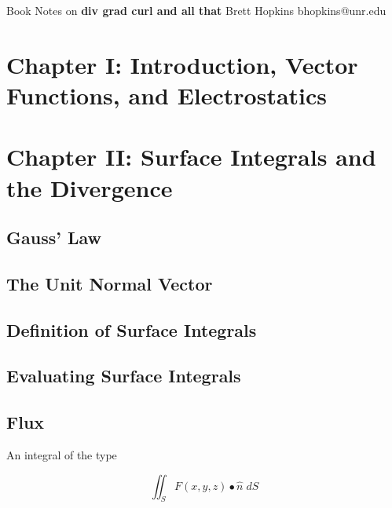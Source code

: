 \documentclass[11pt]{article}
\begin{document}
\thispagestyle{empty}
\vspace*{\fill}

\begin{center}
{\fontsize{22}{22} \selectfont Book Notes on}
\vskip 16pt
{\fontsize{36}{36} \selectfont \bf \sffamily div grad curl and all that}
\vskip 24pt
{\fontsize{18}{18} \selectfont \rmfamily Brett Hopkins}
\vskip 6pt
{\fontsize{14}{14} \selectfont \ttfamily bhopkins@unr.edu}
\vskip 12pt
\end{center}

\vspace*{\fill}

\newpage
\microtoc
\newpage

\section{Chapter I: Introduction, Vector Functions, and Electrostatics}

\section{Chapter II: Surface Integrals and the Divergence}

\subsection{Gauss' Law}

\subsection{The Unit Normal Vector}

\subsection{Definition of Surface Integrals}

\subsection{Evaluating Surface Integrals}

\subsection{Flux}
An integral of the type

\begin{equation}
	\iint_S F(x,y,z) \bullet \hat{n} \; dS
\end{equation}
\end{document}
